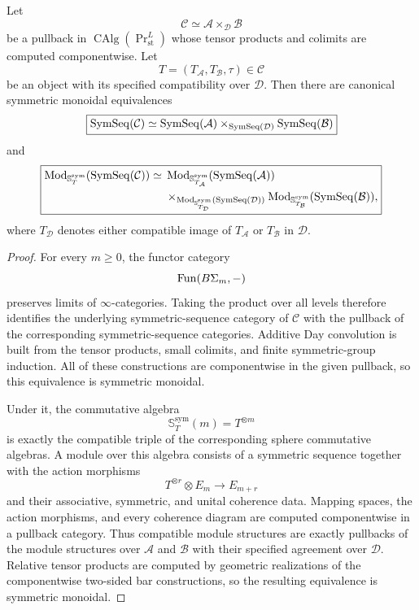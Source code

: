 \begin{lemma}
\label{lem:bn-diff-prespectra-pullback}
Let
\[
    \mathcal C
    \simeq
    \mathcal A\times_{\mathcal D}\mathcal B
\]
be a pullback in
$\operatorname{CAlg}(\operatorname{Pr}^{L}_{\mathrm{st}})$ whose tensor
products and colimits are computed componentwise.  Let
\[
    T=(T_{\mathcal A},T_{\mathcal B},\tau)\in\mathcal C
\]
be an object with its specified compatibility over $\mathcal D$.  Then there
are canonical symmetric monoidal equivalences
\[
    \boxed{
    \operatorname{SymSeq}(\mathcal C)
    \simeq
    \operatorname{SymSeq}(\mathcal A)
    \times_{\operatorname{SymSeq}(\mathcal D)}
    \operatorname{SymSeq}(\mathcal B)
    }
\]
and
\[
\boxed{
\begin{aligned}
    \operatorname{Mod}_{\mathbb S_T^{\mathrm{sym}}}
      (\operatorname{SymSeq}(\mathcal C))
    \simeq{}&
    \operatorname{Mod}_{\mathbb S_{T_{\mathcal A}}^{\mathrm{sym}}}
      (\operatorname{SymSeq}(\mathcal A))
\\
    &\times_{
      \operatorname{Mod}_{\mathbb S_{T_{\mathcal D}}^{\mathrm{sym}}}
      (\operatorname{SymSeq}(\mathcal D))
    }
    \operatorname{Mod}_{\mathbb S_{T_{\mathcal B}}^{\mathrm{sym}}}
      (\operatorname{SymSeq}(\mathcal B)),
\end{aligned}}
\]
where $T_{\mathcal D}$ denotes either compatible image of
$T_{\mathcal A}$ or $T_{\mathcal B}$ in $\mathcal D$.
\end{lemma}

\begin{proof}
For every $m\geq0$, the functor category
\[
    \operatorname{Fun}(B\Sigma_m,-)
\]
preserves limits of $\infty$-categories.  Taking the product over all levels
therefore identifies the underlying symmetric-sequence category of
$\mathcal C$ with the pullback of the corresponding symmetric-sequence
categories.  Additive Day convolution is built from the tensor products,
small colimits, and finite symmetric-group induction.  All of these
constructions are componentwise in the given pullback, so this equivalence is
symmetric monoidal.

Under it, the commutative algebra
\[
    \mathbb S_T^{\mathrm{sym}}(m)=T^{\otimes m}
\]
is exactly the compatible triple of the corresponding sphere commutative
algebras.  A module over this algebra consists of a symmetric sequence
together with the action morphisms
\[
    T^{\otimes r}\otimes E_m\longrightarrow E_{m+r}
\]
and their associative, symmetric, and unital coherence data.  Mapping spaces,
the action morphisms, and every coherence diagram are computed componentwise
in a pullback category.  Thus compatible module structures are exactly
pullbacks of the module structures over $\mathcal A$ and $\mathcal B$ with
their specified agreement over $\mathcal D$.  Relative tensor products are
computed by geometric realizations of the componentwise two-sided bar
constructions, so the resulting equivalence is symmetric monoidal.
\end{proof}

